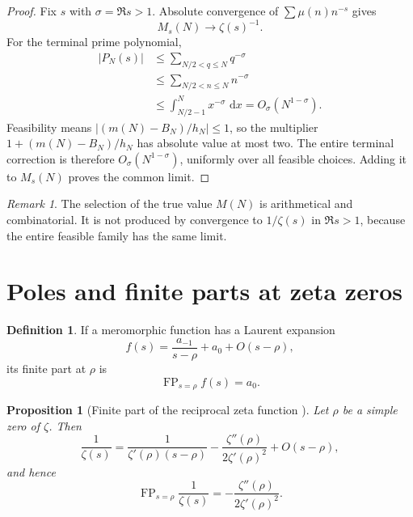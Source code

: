 \documentclass[11pt]{amsart}
\numberwithin{equation}{section}
\theoremstyle{plain}
\newtheorem{proposition}[theorem]{Proposition}
\theoremstyle{definition}
\newtheorem{definition}[theorem]{Definition}
\theoremstyle{remark}
\newtheorem{remark}[theorem]{Remark}
\DeclareMathOperator{\FP}{FP}
\newcommand{\1}{\mathbf{1}}
\newcommand{\dd}{\,\mathrm{d}}
\begin{document}
\begin{proof}
Fix \(s\) with \(\sigma=\Re s>1\).  Absolute convergence of
\(\sum\mu(n)n^{-s}\) gives
\begin{equation}
M_s(N)\longrightarrow\zeta(s)^{-1}.
\label{eq:halfplane_Ms_limit_detailed}
\end{equation}
For the terminal prime polynomial,
\begin{align}
|P_N(s)|
&\leq
\sum_{N/2<q\leq N}q^{-\sigma}
\label{eq:halfplane_P_bound_one}
\\
&\leq
\sum_{N/2<n\leq N}n^{-\sigma}
\label{eq:halfplane_P_bound_two}
\\
&\leq
\int_{N/2-1}^{N}x^{-\sigma}\,\dd x
=
O_\sigma(N^{1-\sigma}).
\label{eq:halfplane_P_bound_three}
\end{align}
Feasibility means \(|(m(N)-B_N)/h_N|\leq1\), so the multiplier
\(1+(m(N)-B_N)/h_N\) has absolute value at most two.  The entire terminal
correction is therefore \(O_\sigma(N^{1-\sigma})\), uniformly over all
feasible choices.  Adding it to \(M_s(N)\) proves the common limit.
\end{proof}

\begin{remark}
\label{rem:arithmetic_not_complex_selection}
The selection of the true value \(M(N)\) is arithmetical and
combinatorial.  It is not produced by convergence to \(1/\zeta(s)\) in
\(\Re s>1\), because the entire feasible family has the same limit.
\end{remark}

\section{Poles and finite parts at zeta zeros}
\label{sec:finite_parts}

\begin{definition}
\label{def:finite_part}
If a meromorphic function has a Laurent expansion
\begin{equation}
f(s)
=
\frac{a_{-1}}{s-\rho}+a_0+O(s-\rho),
\label{eq:finite_part_laurent}
\end{equation}
its finite part at \(\rho\) is
\begin{equation}
\FP_{s=\rho}f(s)=a_0.
\label{eq:finite_part_definition}
\end{equation}
\end{definition}


\begin{proposition}[Finite part of the reciprocal zeta function {}]
\label{prop:finite_part_inverse_zeta}
Let \(\rho\) be a simple zero of \(\zeta\).  Then
\begin{equation}
\frac1{\zeta(s)}
=
\frac{1}{\zeta'(\rho)(s-\rho)}
-
\frac{\zeta''(\rho)}{2\zeta'(\rho)^2}
+
O(s-\rho),
\label{eq:inverse_zeta_laurent}
\end{equation}
and hence
\begin{equation}
\FP_{s=\rho}\frac1{\zeta(s)}
=
-\frac{\zeta''(\rho)}{2\zeta'(\rho)^2}.
\label{eq:inverse_zeta_finite_part}
\end{equation}
\end{proposition}
\end{document}
